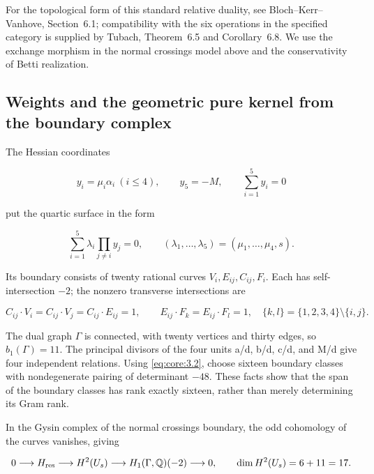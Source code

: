 \documentclass[11pt,a4paper,oneside]{article}
\theoremstyle{plain}
\theoremstyle{definition}
\theoremstyle{remark}
\numberwithin{equation}{section}
\begin{document}
For the topological form of this standard relative duality, see Bloch--Kerr--Vanhove, Section~6.1; compatibility with the six operations in the specified category is supplied by Tubach, Theorem~6.5 and Corollary~6.8. \cite{bkv,tubach} We use the exchange morphism in the normal crossings model above and the conservativity of Betti realization.


\subsection{Weights and the geometric pure kernel from the boundary complex}\label{sec:core:3}

The Hessian coordinates

\begin{equation}
y_i=\mu_i\alpha_i\ (i\leq4),\qquad y_5=-M,\qquad
 \sum_{i=1}^5y_i=0
\end{equation}

put the quartic surface in the form

\begin{equation}
\sum_{i=1}^5\lambda_i\prod_{j\ne i}y_j=0,
 \qquad (\lambda_1,\ldots,\lambda_5)=(\mu_1,\ldots,\mu_4,s).
                                                               \label{eq:core:3.1}
\end{equation}

Its boundary consists of twenty rational curves \(V_i,E_{ij},C_{ij},F_i\). Each has self-intersection \(- 2\); the nonzero transverse intersections are

\begin{equation}
C_{ij}\cdot V_i=C_{ij}\cdot V_j=C_{ij}\cdot E_{ij}=1,
 \qquad E_{ij}\cdot F_k=E_{ij}\cdot F_l=1,
 \quad\{k,l\}=\{1,2,3,4\}\setminus\{i,j\}.             \label{eq:core:3.2}
\end{equation}

The dual graph \(\Gamma \) is connected, with twenty vertices and thirty edges, so \(b_1(\Gamma)=11\). The principal divisors of the four units a/d, b/d, c/d, and M/d give four independent relations. Using \eqref{eq:core:3.2}, choose sixteen boundary classes with nondegenerate pairing of determinant \(- 48\). These facts show that the span of the boundary classes has rank exactly sixteen, rather than merely determining its Gram rank.

In the Gysin complex of the normal crossings boundary, the odd cohomology of the curves vanishes, giving

\begin{equation}
0\longrightarrow H_{\rm res}\longrightarrow H^2(U_s)
 \longrightarrow H_1(\Gamma,\mathbb Q)(-2)\longrightarrow0,
 \qquad \dim H^2(U_s)=6+11=17.                          \label{eq:core:3.3}
\end{equation}
\end{document}
